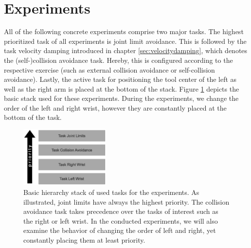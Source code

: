 \section{Experiments}
All of the following concrete experiments comprise two major tasks. The highest prioritized task of all experiments is joint limit avoidance. This is followed by the task velocity damping introduced in chapter \ref{sec:velocitydamping}, which denotes the (self-)collision avoidance task. Hereby, this is configured according to the respective exercise (such as external collision avoidance or self-collision avoidance). Lastly, the active task for positioning the tool center of the left as well as the right arm is placed at the bottom of the stack. Figure \ref{fig:basicstack} depicts the basic stack used for these experiments. During the experiments, we change the order of the left and right wrist, however they are constantly placed at the bottom of the task.
\begin{figure}[h!]
  \centering
    \includegraphics[width=0.4\textwidth]{../figures/stack_experiments.eps}
    \caption{Basic hierarchy stack of used tasks for the experiments. As illustrated, joint limits have always the highest priority. The collision avoidance task takes precedence over the tasks of interest such as the right or left wrist. In the conducted experiments, we will also examine the behavior of changing the order of left and right, yet constantly placing them at least priority.}
    \label{fig:basicstack}
\end{figure}

